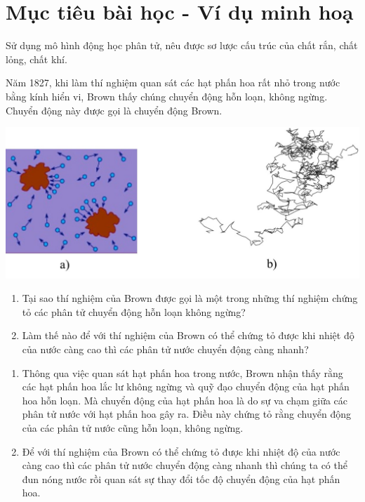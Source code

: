 \section{Mục tiêu bài học - Ví dụ minh hoạ}
\begin{dang}{Sử dụng mô hình động học phân tử, nêu được sơ lược cấu trúc của chất rắn, chất lỏng, chất khí.}
	{Năm 1827, khi làm thí nghiệm quan sát các hạt phấn hoa rất nhỏ trong nước bằng kính hiển vi, Brown thấy chúng chuyển động hỗn loạn, không ngừng. Chuyển động này được gọi là chuyển động Brown.\\
		\begin{center}
			\includegraphics[width=0.6\linewidth]{../figs/VN12-Y24-PH-SYL-001-1}
		\end{center}
		\begin{enumerate}[label=\alph*)]
			\item Tại sao thí nghiệm của Brown được gọi là một trong những thí nghiệm chứng tỏ các phân tử chuyển động hỗn loạn không ngừng?
			\item Làm thế nào để với thí nghiệm của Brown có thể chứng tỏ được khi nhiệt độ của nước càng cao thì các phân tử nước chuyển động càng nhanh?
		\end{enumerate}
		
	}
	{
		\begin{enumerate}[label=\alph*)]
			\item Thông qua việc quan sát hạt phấn hoa trong nước, Brown nhận thấy rằng các hạt phấn hoa lắc lư không ngừng và quỹ đạo chuyển động của hạt phấn hoa hỗn loạn. Mà chuyển động của hạt phấn hoa là do sự va chạm  giữa các phân tử nước với hạt phấn hoa gây ra. Điều này chứng tỏ rằng chuyển động của các phân tử nước cũng hỗn loạn, không ngừng.
			\item Để với thí nghiệm của Brown có thể chứng tỏ được khi nhiệt độ của nước càng cao thì các phân tử nước chuyển động càng nhanh thì chúng ta có thể đun nóng nước rồi quan sát sự thay đổi tốc độ chuyển động của hạt phấn hoa.
		\end{enumerate}
	}
	

\end{dang}
